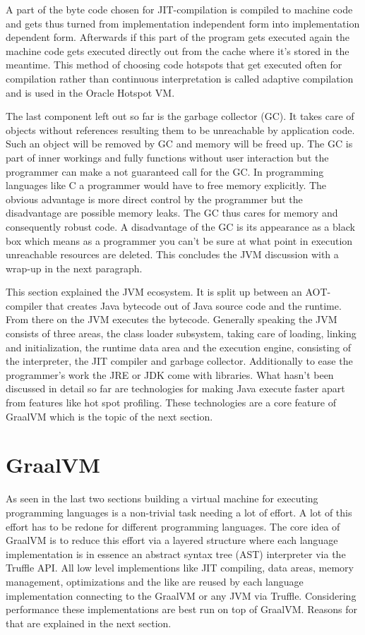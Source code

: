A part of the byte code chosen for JIT-compilation is compiled to machine code and gets thus turned from implementation independent form into implementation dependent form. Afterwards if this part of the program gets executed again the machine code gets executed directly out from the cache where it's stored in the meantime. This method of choosing code hotspots that get executed often for compilation rather than continuous interpretation is called adaptive compilation and is used in the Oracle Hotspot VM. \cite{Lindholm}

The last component left out so far is the garbage collector (GC). It takes care of objects without references resulting them to be unreachable by application code. Such an object will be removed by GC and memory will be freed up. The GC is part of inner workings and fully functions without user interaction but the programmer can make a not guaranteed call for the GC.\cite{Lindholm} In programming languages like C a programmer would have to free memory explicitly. The obvious advantage is more direct control by the programmer but the disadvantage are possible memory leaks. The GC thus cares for memory and consequently robust code. A disadvantage of the GC is its appearance as a black box which means as a programmer you can't be sure at what point in execution unreachable resources are deleted. This concludes the JVM discussion with a wrap-up in the next paragraph.

This section explained the JVM ecosystem. It is split up between an AOT-compiler that creates Java bytecode out of Java source code and the runtime. From there on the JVM executes the bytecode. Generally speaking the JVM consists of three areas, the class loader subsystem, taking care of loading, linking and initialization, the runtime data area and the execution engine, consisting of the interpreter, the JIT compiler and garbage collector. Additionally to ease the programmer's work the JRE or JDK come with libraries. What hasn't been discussed in detail so far are technologies for making Java execute faster apart from features like hot spot profiling. These technologies are a core feature of GraalVM which is the topic of the next section.

\section{GraalVM}

As seen in the last two sections building a virtual machine for executing programming languages is a non-trivial task needing a lot of effort. A lot of this effort has to be redone for different programming languages. The core idea of GraalVM is to reduce this effort via a layered structure where each language implementation is in essence an abstract syntax tree (AST) interpreter via the Truffle API. All low level implementions like JIT compiling, data areas, memory management, optimizations and the like are reused by each language implementation connecting to the GraalVM or any JVM via Truffle. Considering performance these implementations are best run on top of GraalVM. Reasons for that are explained in the next section.

